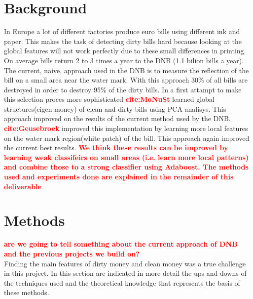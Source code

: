 \documentclass[11pt,twocolumn]{article}
\newcommand{\todo}[1]{\textcolor{red}{\textbf{#1}}}
\begin{document}
	\section{Background}\label{sec:background}
		\hspace*{10px}In Europe a lot of different factories produce euro bills using
		different ink and paper. This makes the task of detecting dirty bills hard
		because looking at the global features will not work perfectly due to these
		small differences in printing. On average bills return 2 to 3 times a year to
		the DNB (1.1 bilion bills a year). 
		\hspace*{10px}The current, naive, approach used in the DNB is to measure the
		reflection of the bill on a small area near the water mark. With this
		approach 30\% of all bills are destroyed in order to destroy 95\% of the
		dirty bills. In a first attampt to make this selection proces more
		sophisticated \todo{cite:MoNuSt} learned global structures(eigen
		money) of clean and dirty bills using PCA analisys. This approach improved on the
		results of the current method used by the DNB. \todo{cite:Geusebroek}
		improved this implementation by learning more local features on the water
		mark region(white patch) of the bill. This approach again improved the
		current best results.
		\hspace*{10px}\todo{We think these results can be improved by learning weak
		classifeirs on small areas (i.e. learn more local patterns) and combine those
		to a strong classifier using Adaboost. The methods used and experiments done
		are explained in the remainder of this deliverable}
	
	\section{Methods}\label{sec:Methods}
		\todo{are we going to tell something about the current approach of DNB and the
		previous projects we build on?}\\
		\hspace*{10px}Finding the main features of dirty money and clean money was a
		true challenge in this project. In this section are indicated in more detail
		the ups and downs of the techniques used and the theoretical knowledge that
		represents the basis of these methods.
\end{document}
